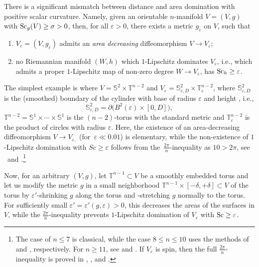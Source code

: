 \documentclass[pdftex]{sigma}
\numberwithin{equation}{section}
\newcommand{\SSS}{\mathbb{S}}
\newcommand{\TTT}{\mathbb{T}}
\newcommand{\eps}{\varepsilon}
\newcommand{\Sc}{{\rm Sc}}
\newcommand{\myicon}{$\,\,\,\triangleright$}
\begin{document}
 \begin{Remark} There is a significant mismatch between distance and area domination with positive scalar curvature.
Namely, given an orientable $n$-manifold $V=(V,g)$ with $\Sc_g(V) \geq \sigma>0$, then, for all $\varepsilon >0$, there exists a metric $g_{\varepsilon}$ on $V$, such that
\begin{enumerate}[\myicon]\itemsep=0pt
\item $ V_{\varepsilon}=(V,g_{\varepsilon})$ admits an {\it area decreasing} diffeomorphism $V\to V_{\varepsilon }$;
\item no Riemannian manifold $(W,h)$ which $1$-Lipschitz dominates $V_\eps$, i.e., which admits a proper $1$-Lipschitz map of non-zero degree $W \to V_\eps$, has $\Sc_h \geq \varepsilon$.
\end{enumerate}
The simplest example is where $V=\SSS^2\times \TTT^{n-2}$ and $V_\varepsilon =\SSS^2_{\varepsilon, D}\times \TTT_\varepsilon^{n-2}$, where $\SSS^2_{\varepsilon, D}$ is the (smoothed) boundary of the cylinder with base of radius $\varepsilon$ and height , i.e.,
\[
 \SSS^2_{\varepsilon, D}=\partial \big( B^2(\varepsilon)\times [0,D] \big),
 \]
$\TTT^{n-2} = \SSS^1 \times \cdots \times \SSS^1$ is the $(n-2)$-torus with the standard metric and $\TTT_\varepsilon^{n-2}$ is the product of circles with radius $\varepsilon$.
Here, the existence of an area-decreasing diffeomorphism $V\to V_{\varepsilon, }$ (for~${\varepsilon \ll 0.01}$) is elementary, while the non-existence of $1$-Lipschitz domination with $Sc \geq \varepsilon$ follows from the~$\frac {2\pi}{n}$-inequality as $10 > 2\pi$, see \cite[Section 3.6]{Gr21} and \cite[Theorem 2.8 and Proposition~2.21]{Raede22}.\footnote{The case of $n \leq 7$ is classical, while the case $8 \leq n \leq 10$ uses the methods of \cite{Smale} and \cite{CMS}, respectively.
For $n \geq 11$, see \cite[Theorem 4.6]{S-Y2017} and \cite{Loh2018}.
If $V_\eps$ is spin, then the full $\frac {2\pi}{n}$-inequality is proved in \cite[Theorem 1.4]{Ze2019}, \cite[Corollary 1.5]{Ze2020}, \cite[Theorem D]{Ce2020} and \cite[Theorem 1.3]{G-X-Y2020}.}

Now, for an arbitrary $(V,g)$, let $\TTT^{n-1}\subset V $ be a smoothly embedded torus and let us modify the metric $g$ in a small neighborhood $\TTT^{n-1}\times [-\delta, +\delta]\subset V$ of the torus by $\varepsilon'$-shrinking $g$ along the torus and -stretching $g$ normally to the torus.
For sufficiently small $\eps' = \eps'(g, \eps) > 0$, this decreases the areas of the surfaces in $V$, while the $\frac {2\pi}{n}$-inequality prevents $1$-Lipschitz domination of $V_\varepsilon$ with $\Sc \geq \varepsilon$.
\end{Remark}
\end{document}
